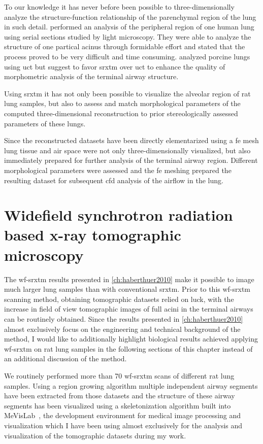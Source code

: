 To our knowledge it has never before been possible to three-dimensionally analyze the structure-function relationship of the parenchymal region of the lung in such detail. \citet{Berend1991} performed an analysis of the peripheral region of one human lung using serial sections studied by light microscopy. They were able to analyze the structure of one partical acinus through formidable effort and stated that the process proved to be very difficult and time consuming. \citet{Litzlbauer2006} analyzed porcine lungs using \ac{uct} but suggest to favor \ac{srxtm} over \ac{uct} to enhance the quality of morphometric analysis of the terminal airway structure.

Using \ac{srxtm} it has not only been possible to visualize the alveolar region of rat lung samples, but also to assess and match morphological parameters of the computed three-dimensional reconstruction to prior stereologically assessed parameters of these lungs.

Since the reconstructed datasets have been directly elementarized using a \ac{fe} mesh lung tissue and air space were not only three-dimensionally visualized, but also immediately prepared for further analysis of the terminal airway region. Different morphological parameters were assessed and the \ac{fe} meshing prepared the resulting dataset for subsequent \ac{cfd} analysis of the airflow in the lung.

\section[WF-SRXTM]{Widefield synchrotron radiation based x-ray tomographic microscopy}
The \ac{wf-srxtm} results presented in \autoref{ch:haberthuer2010} make it possible to image much larger lung samples than with conventional \ac{srxtm}. Prior to this \ac{wf-srxtm} scanning method, obtaining tomographic datasets relied on luck, with the increase in field of view tomographic images of full acini in the terminal airways can be routinely obtained. Since the results presented in \autoref{ch:haberthuer2010} almost exclusively focus on the engineering and technical background of the method, I would like to additionally highlight biological results achieved applying \ac{wf-srxtm} on rat lung samples in the following sections of this chapter instead of an additional discussion of the method.

We routinely performed more than 70 \ac{wf-srxtm} scans of different rat lung samples. Using a region growing algorithm multiple independent airway segments have been extracted from those datasets and the structure of these airway segments has been visualized using a skeletonization algorithm built into MeVisLab~\cite{Bitter2007}, the development environment for medical image processing and visualization which I have been using almost exclusively for the analysis and visualization of the tomographic datasets during my work.


